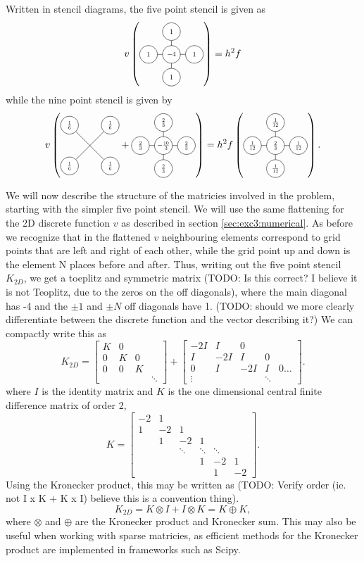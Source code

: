 Written in stencil diagrams, the five point stencil is given as \cite{part2}
$$
v \left(\crossStencil{1}{1}{1}{1}{-4}\right) = h^2 f
$$
while the nine point stencil is given by
$$
v
\left(
\xStencil{\frac16}{\frac16}{\frac16}{\frac16}
+
\crossStencil{\frac23}{\frac23}{\frac23}{\frac23}{-\frac{10}{3}}
\right)
=
h^2
f
\left(
\crossStencil{\frac1{12}}{\frac1{12}}{\frac1{12}}{\frac1{12}}{\frac23}
\right).
$$


We will now describe the structure of the matricies involved in the problem, starting with the simpler five point stencil.
We will use the same flattening for the 2D discrete function $v$ as described in section \ref{sec:exc3:numerical}.
As before we recognize that in the flattened $v$ neighbouring elements correspond to grid points that are left and right of each other, while the grid point up and down is the element N places before and after.
Thus, writing out the five point stencil $K_{2D}$, we get a toeplitz and symmetric matrix (TODO: Is this correct? I believe it is not Teoplitz, due to the zeros on the off diagonals), where the main diagonal has -4 and the $\pm 1$ and $\pm N$ off diagonals have 1.
(TODO: should we more clearly differentiate between the discrete function and the vector describing it?)
We can compactly write this as
$$
K_{2D} =
\begin{bmatrix}
  K & 0 \\
  0 & K & 0\\
  0 & 0 & K \\
  &&&\ddots
\end{bmatrix}
+
\begin{bmatrix}
  -2I & I & 0 &  \\
  I & -2I & I & 0 \\
  0 & I & -2I & I & 0 \dots\\
  \vdots&&&\ddots
\end{bmatrix}.
$$
where $I$ is the identity matrix and $K$ is the one dimensional central finite difference matrix of order 2,
$$
K =
\begin{bmatrix}
  -2 & 1 &   \\
  1 & -2 & 1 &  \\
  & 1 & -2 & 1 & \\
  &&\ddots&\ddots&\ddots\\
  &&& 1 & -2 & 1\\
  &&&& 1 & -2
\end{bmatrix}.
$$
Using the Kronecker product, this may be written as
(TODO: Verify order (ie. not I x K + K x I) believe this is a convention thing).
$$
K_{2D} = K \otimes I + I \otimes K = K \oplus K,
$$
where $\otimes$ and $\oplus$ are the Kronecker product and Kronecker sum.
This may also be useful when working with sparse matricies, as efficient methods for the Kronecker product are implemented in frameworks such as Scipy\cite{scipy_kron}.

